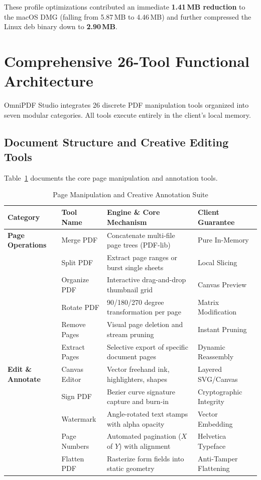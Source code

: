 \documentclass[11pt,a4paper]{article}
\begin{document}
These profile optimizations contributed an immediate \textbf{1.41\,MB reduction} to the macOS DMG (falling from 5.87\,MB to 4.46\,MB) and further compressed the Linux deb binary down to \textbf{2.90\,MB}.

\section{Comprehensive 26-Tool Functional Architecture}
\label{sec:tools}

OmniPDF Studio integrates 26 discrete PDF manipulation tools organized into seven modular categories. All tools execute entirely in the client's local memory.

\subsection{Document Structure and Creative Editing Tools}
Table~\ref{tab:tools_edit} documents the core page manipulation and annotation tools.

\begin{table}[htbp]
\centering
\caption{Page Manipulation and Creative Annotation Suite}
\label{tab:tools_edit}
\vspace{0.5em}
\small
\begin{tabularx}{\textwidth}{llXl}
\toprule
\textbf{Category} & \textbf{Tool Name} & \textbf{Engine \& Core Mechanism} & \textbf{Client Guarantee} \\
\midrule
\textbf{Page Operations} & Merge PDF & Concatenate multi-file page trees (PDF-lib) & Pure In-Memory \\
& Split PDF & Extract page ranges or burst single sheets & Local Slicing \\
& Organize PDF & Interactive drag-and-drop thumbnail grid & Canvas Preview \\
& Rotate PDF & 90/180/270 degree transformation per page & Matrix Modification \\
& Remove Pages & Visual page deletion and stream pruning & Instant Pruning \\
& Extract Pages & Selective export of specific document pages & Dynamic Reassembly \\
\midrule
\textbf{Edit \& Annotate} & Canvas Editor & Vector freehand ink, highlighters, shapes & Layered SVG/Canvas \\
& Sign PDF & Bezier curve signature capture and burn-in & Cryptographic Integrity \\
& Watermark & Angle-rotated text stamps with alpha opacity & Vector Embedding \\
& Page Numbers & Automated pagination ($X$ of $Y$) with alignment & Helvetica Typeface \\
& Flatten PDF & Rasterize form fields into static geometry & Anti-Tamper Flattening \\
\bottomrule
\end{tabularx}
\end{table}
\end{document}
